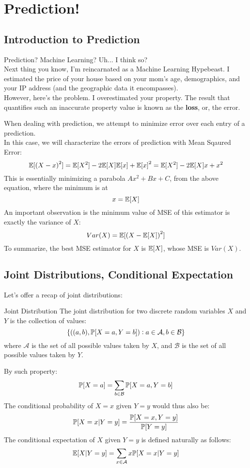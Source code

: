 \chapter{Prediction!}

\section{Introduction to Prediction}
Prediction? Machine Learning? Uh... I think so? \\
Next thing you know, I'm reincarnated as a Machine Learning Hypebeast. I estimated the price of your house based on your mom's age, demographics, and your IP address (and the geographic data it encompasses). \\
However, here's the problem. I overestimated your property. The result that quantifies such an inaccurate property value is known as the \textbf{loss}, or, the error.

When dealing with prediction, we attempt to minimize error over each entry of a prediction. \\
In this case, we will characterize the errors of prediction with Mean Sqaured Error:
\[
    \E[{(X - x)}^2] = \E[X^2] - 2 \E[X] \E[x] + {\E[x]}^2 = \E[X^2] - 2\E[X]x + x^2
\]
This is essentially minimizing a parabola $Ax^2 + Bx + C$, from the above equation, where the minimum is at
\[x = \E[X]\]
An important observation is the minimum value of MSE of this estimator is exactly the variance of $X$:
\[Var(X) = \E[{(X - \E[X])}^2]\]
To summarize, the best MSE estimator for $X$ is $\E[X]$, whose MSE is $Var(X)$.

\section{Joint Distributions, Conditional Expectation}
Let's offer a recap of joint distributions:
\begin{ln-define}{Joint Distribution}{}
    The joint distribution for two discrete random variables $X$ and $Y$ is the collection of values:
    \[\{((a, b), \P[X = a, Y = b]) : a \in \mathcal{A}, b \in \mathcal{B}\}\]
    where $\mathcal{A}$ is the set of all possible values taken by $X$, and $\mathcal{B}$ is the set of all possible values taken by $Y$.
\end{ln-define}
By such property:
\[\P[X = a] = \sum_{b \in \mathcal{B}} \P[X = a, Y = b]\]
The conditional probability of $X = x$ given $Y = y$ would thus also be:
\[\P[X = x | Y = y] = \frac{\P[X = x, Y = y]}{\P[Y = y]}\]
The conditional expectation of $X$ given $Y = y$ is defined naturally as follows:
\[\E[X | Y = y] = \sum_{x \in \mathcal{A}} x \P[X = x | Y = y]\]

